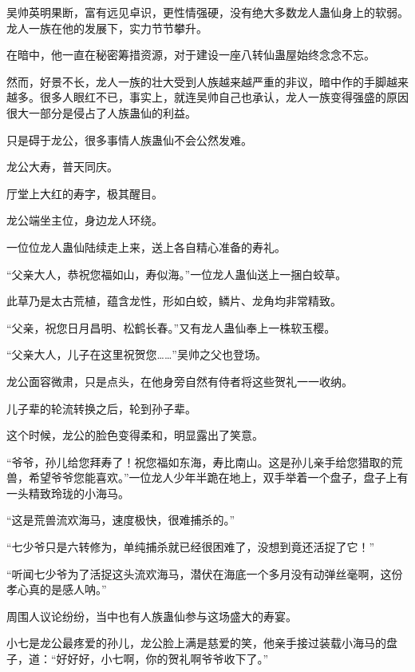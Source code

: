 
\begin{this_body}



吴帅英明果断，富有远见卓识，更性情强硬，没有绝大多数龙人蛊仙身上的软弱。龙人一族在他的发展下，实力节节攀升。

在暗中，他一直在秘密筹措资源，对于建设一座八转仙蛊屋始终念念不忘。

然而，好景不长，龙人一族的壮大受到人族越来越严重的非议，暗中作的手脚越来越多。很多人眼红不已，事实上，就连吴帅自己也承认，龙人一族变得强盛的原因很大一部分是侵占了人族蛊仙的利益。

只是碍于龙公，很多事情人族蛊仙不会公然发难。

龙公大寿，普天同庆。

厅堂上大红的寿字，极其醒目。

龙公端坐主位，身边龙人环绕。

一位位龙人蛊仙陆续走上来，送上各自精心准备的寿礼。

“父亲大人，恭祝您福如山，寿似海。”一位龙人蛊仙送上一捆白蛟草。

此草乃是太古荒植，蕴含龙性，形如白蛟，鳞片、龙角均非常精致。

“父亲，祝您日月昌明、松鹤长春。”又有龙人蛊仙奉上一株软玉樱。

“父亲大人，儿子在这里祝贺您……”吴帅之父也登场。

龙公面容微肃，只是点头，在他身旁自然有侍者将这些贺礼一一收纳。

儿子辈的轮流转换之后，轮到孙子辈。

这个时候，龙公的脸色变得柔和，明显露出了笑意。

“爷爷，孙儿给您拜寿了！祝您福如东海，寿比南山。这是孙儿亲手给您猎取的荒兽，希望爷爷您能喜欢。”一位龙人少年半跪在地上，双手举着一个盘子，盘子上有一头精致玲珑的小海马。

“这是荒兽流欢海马，速度极快，很难捕杀的。”

“七少爷只是六转修为，单纯捕杀就已经很困难了，没想到竟还活捉了它！”

“听闻七少爷为了活捉这头流欢海马，潜伏在海底一个多月没有动弹丝毫啊，这份孝心真的是感人呐。”

周围人议论纷纷，当中也有人族蛊仙参与这场盛大的寿宴。

小七是龙公最疼爱的孙儿，龙公脸上满是慈爱的笑，他亲手接过装载小海马的盘子，道：“好好好，小七啊，你的贺礼啊爷爷收下了。”


\end{this_body}
